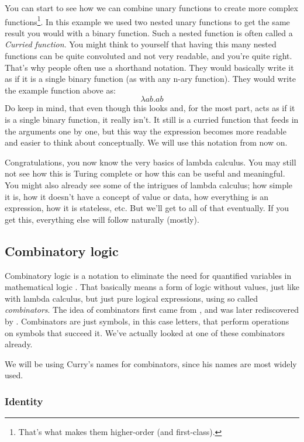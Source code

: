 \documentclass[11pt]{article}
\begin{document}
You can start to see how we can combine unary functions to create more complex
functions\footnote{That's what makes them higher-order (and first-class).}. In
this example we used two nested unary functions to get the same result you
would with a binary function. Such a nested function is often called a
\emph{Curried function}.
You might think to yourself that having this many nested functions can be quite
convoluted and not very readable, and you're quite right. That's why people
often use a shorthand notation. They would basically write it as if it is a
single binary function (as with any n-ary function). They would write the
example function above as:
\[\lambda ab.ab\]
Do keep in mind, that even though this looks and, for the most part, acts as if
it is a single binary function, it really isn't. It still is a curried function
that feeds in the arguments one by one, but this way the expression becomes
more readable and easier to think about conceptually. We will use this notation
from now on.

Congratulations, you now know the very basics of lambda calculus. You may still
not see how this is Turing complete or how this can be useful and meaningful.
You might also already see some of the intrigues of lambda calculus; how simple
it is, how it doesn't have a concept of value or data, how everything is an
expression, how it is stateless, etc. But we'll get to all of that eventually.
If you get this, everything else will follow naturally (mostly).

\subsection{Combinatory logic}\label{combinatorylogic}

Combinatory logic is a notation to eliminate the need for quantified variables
in mathematical logic \parencite{wiki:Combinatory_logic}. That basically means
a form of logic without values, just like with lambda calculus, but just pure
logical expressions, using so called \emph{combinators}. The idea of
combinators first came from \textcite{schonfinkel1924}, and was later
rediscovered by \textcite{curry1930}. Combinators are just symbols, in this
case letters, that perform operations on symbols that succeed it. We've
actually looked at one of these combinators already.

We will be using Curry's names for combinators, since his names are most widely
used.

\subsubsection{Identity}
\end{document}
